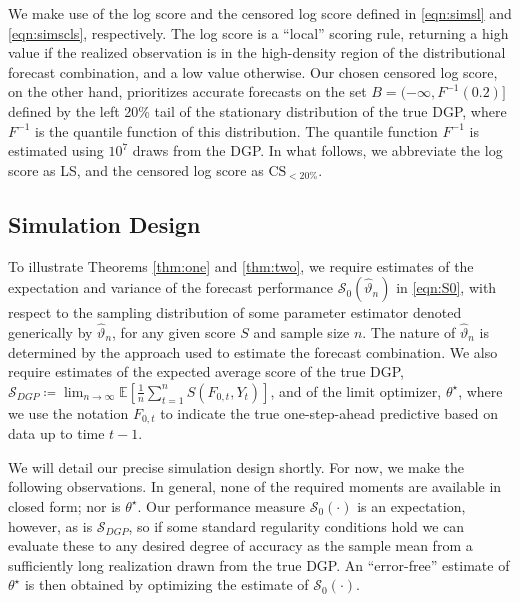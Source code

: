 \documentclass[12pt]{article}
\theoremstyle{definition}
\theoremstyle{remark}
\begin{document}
We make use of the log score and the censored log score defined in \eqref{eqn:simsl} and \eqref{eqn:simscls}, respectively. The log score is a ``local'' scoring rule, returning a high value if the realized observation is in the high-density region of the distributional forecast combination, and a low value otherwise. Our chosen censored log score, on the other hand, prioritizes accurate forecasts on the set $B = (-\infty, F^{-1}(0.2)]$ defined by the left 20\% tail of the stationary distribution of the true DGP, where $F^{-1}$ is the quantile function of this distribution. The quantile function $F^{-1}$ is estimated using $10^7$ draws from the DGP. In what follows, we abbreviate the log score as LS, and the censored log score as $\mathrm{CS}_{<20\%}$.

\subsection{Simulation Design}

To illustrate Theorems \ref{thm:one} and \ref{thm:two}, we require estimates of the expectation and variance of the forecast performance $\mathcal{S}_0(\hat{\vartheta}_n)$ in \eqref{eqn:S0}, with respect to the sampling distribution of some parameter estimator denoted generically by $\hat{\vartheta}_n$, for any given score $S$ and sample size $n$. The nature of $\hat{\vartheta}_n$ is determined by the approach used to estimate the forecast combination. We also require estimates of the expected average score of the true DGP, $\mathcal{S}_{DGP} \coloneqq \lim_{n \to \infty} \mathbb{E}[\frac{1}{n} \sum_{t=1}^n S(F_{0,t}, Y_t)]$, and of the limit optimizer, $\theta^{\star}$, where we use the notation $F_{0,t}$ to indicate the true one-step-ahead predictive based on data up to time $t-1$.

We will detail our precise simulation design shortly. For now, we make the following observations. In general, none of the required moments are available in closed form; nor is $\theta ^{\star }$. Our performance measure  $\mathcal{S}_{0}(\cdot)$ is an expectation, however, as is $\mathcal{S}_{DGP}$, so if some standard regularity conditions hold we can evaluate these to any desired degree of accuracy as the sample mean from a sufficiently long realization drawn from the true DGP. An ``error-free'' estimate of $\theta ^{\star }$ is then obtained by optimizing the estimate of $\mathcal{S}_{0}(\cdot)$.
\end{document}
